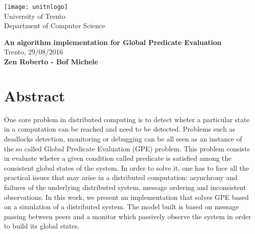\begin{titlepage}
\thispagestyle{plain}

\begin{center}
	\texttt{[image: unitnlogo]}	\\
	University of Trento	\\
	\small {Department of Computer Science}	\\[1cm]
\end{center}

{\centering
\textbf{\LARGE An algorithm implementation for Global Predicate Evaluation}\\[0.5cm]
\small{Trento, 29/08/2016}	\\[1cm]
\textbf{Zen Roberto - Bof Michele}

}
\vfill

\section*{Abstract}

One core problem in distributed computing is to detect wheter a particular state in a computation can be reached and need to be detected. Problems such as deadlocks detection, monitoring or debugging can be all seen as an instance of the so called Global Predicate Evaluation (GPE) problem. This problem consists in evaluate wheter a given condition called predicate is satisfied among the consistent global states of the system. In order to solve it, one has to face all the practical issues that may arise in a distributed computation: asynchrony and failures of the underlying distributed system, message ordering and inconsistent observations. In this work, we present an implementation that solves GPE based on a simulation of a distributed system. The model built is based on message passing between peers and a monitor which passively observe the system in order to build its global states.


\end{titlepage}

